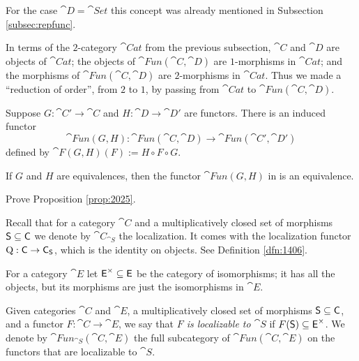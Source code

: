 For the case $\cat{D} = \cat{Set}$ this concept was already mentioned in 
Subsection \ref{subsec:repfunc}. 

In terms of the $2$-category $\cat{Cat}$ from the previous subsection,
$\cat{C}$ and $\cat{D}$ are objects of $\cat{Cat}$; the objects of 
$\cat{Fun}(\cat{C}, \cat{D})$ are $1$-morphisms in 
$\cat{Cat}$; and the morphisms  of 
$\cat{Fun}(\cat{C}, \cat{D})$ are $2$-morphisms in 
$\cat{Cat}$. Thus we made a ``reduction of order'', from $2$ to $1$, by 
passing from $\cat{Cat}$ to $\cat{Fun}(\cat{C}, \cat{D})$.

Suppose $G : \cat{C}' \to \cat{C}$ and 
$H : \cat{D} \to \cat{D}'$ are functors. There is an induced functor
\begin{equation} \label{eqn:2025}
\cat{Fun}(G, H) : \cat{Fun}(\cat{C}, \cat{D}) \to 
\cat{Fun}(\cat{C}', \cat{D}')
\end{equation}
defined by 
$\cat{F}(G, H)(F) := H \circ F \circ G$. 

\begin{prop} \label{prop:2025}
If $G$ and $H$ are equivalences, then the functor $\cat{Fun}(G, H)$ in 
\tup{(\ref{eqn:2025})} is an equivalence.
\end{prop}

\begin{exer} \label{exer:2035}
Prove Proposition \ref{prop:2025}.
\end{exer}

Recall that for a category $\cat{C}$ and a multiplicatively closed set of 
morphisms $\operatorname{\mathsf{S}} \subseteq \operatorname{\mathsf{C}}$ we denote by $\cat{C}_{\cat{S}}$ the 
localization. It comes with the localization functor 
$\operatorname{Q} : \operatorname{\mathsf{C}} \to \operatorname{\mathsf{C}}_{\operatorname{\mathsf{S}}}$,
which is the identity on objects. See Definition \ref{dfn:1406}. 

For a category $\cat{E}$ let $\operatorname{\mathsf{E}}^{\times} \subseteq \operatorname{\mathsf{E}}$
be the category of isomorphisms; it has all the objects, but its  
morphisms are just the isomorphisms in $\cat{E}$. 

\begin{dfn} \label{dfn:2037}
Given categories $\cat{C}$ and $\cat{E}$, a multiplicatively closed set of 
morphisms $\operatorname{\mathsf{S}} \subseteq \operatorname{\mathsf{C}}$, and a functor $F : \cat{C} \to \cat{E}$,
we say that {\em $F$ is localizable to $\cat{S}$} if 
$F(\operatorname{\mathsf{S}}) \subseteq  \operatorname{\mathsf{E}}^{\times}$. 
We denote by
$\cat{Fun}_{\cat{S}}(\cat{C}, \cat{E})$%
the full subcategory of $\cat{Fun}(\cat{C}, \cat{E})$
on the functors that are localizable to $\cat{S}$.
\end{dfn}

